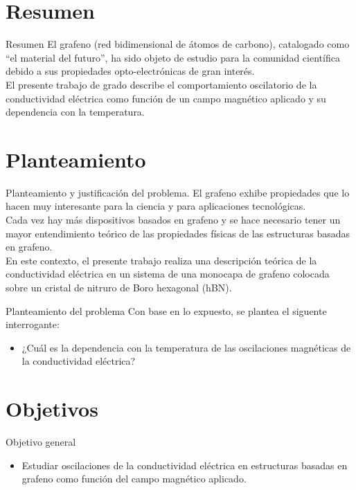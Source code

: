 \section{Resumen}
	\begin{frame}{Resumen}
	\justifying
		El grafeno (red bidimensional de átomos de carbono), catalogado como “el material del futuro”, ha sido objeto de estudio para la comunidad cient\'ifica debido a sus propiedades opto-electrónicas de gran inter\'es.\\
		\vspace{0.5cm}
		El presente trabajo de grado describe el comportamiento oscilatorio de la conductividad el\'ectrica como funci\'on de un campo magnético aplicado
		y su dependencia con la temperatura.
	\end{frame}

\section{Planteamiento}
	\begin{frame}{Planteamiento y justificación del problema.}
		\justifying
		El grafeno exhibe propiedades que lo hacen muy interesante para la ciencia y para aplicaciones tecnológicas.\\
		Cada vez hay más dispositivos basados en grafeno y se hace necesario tener un mayor entendimiento teórico
		de las propiedades físicas de las estructuras basadas en grafeno.\\
		\vspace{0.5cm}
		En este contexto, el presente trabajo realiza una descripción teórica de la conductividad eléctrica
		en un sistema de una monocapa de grafeno colocada sobre un cristal de nitruro de Boro hexagonal (hBN).
	\end{frame}

	\begin{frame}{Planteamiento del problema}
		\justifying
		Con base en lo expuesto, se plantea el siguente interrogante:
		\begin{itemize}
			\item ¿Cuál es la dependencia con la temperatura de las oscilaciones magnéticas de la conductividad eléctrica?
		\end{itemize}
	\end{frame}

\section{Objetivos}
	\begin{frame}{Objetivo general}
		\justifying
		\begin{itemize}
			\item Estudiar oscilaciones de la conductividad eléctrica en estructuras basadas en grafeno como función del campo magnético aplicado.
			\end{itemize}
	\end{frame}

